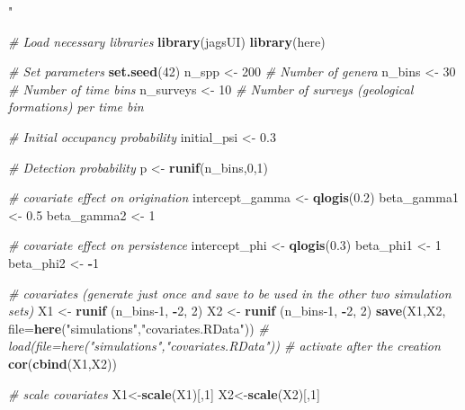 \documentclass[
]{article}
\newenvironment{Shaded}{\begin{snugshade}}{\end{snugshade}}
\newcommand{\AttributeTok}[1]{\textcolor[rgb]{0.13,0.29,0.53}{#1}}
\newcommand{\CommentTok}[1]{\textcolor[rgb]{0.56,0.35,0.01}{\textit{#1}}}
\newcommand{\DecValTok}[1]{\textcolor[rgb]{0.00,0.00,0.81}{#1}}
\newcommand{\FloatTok}[1]{\textcolor[rgb]{0.00,0.00,0.81}{#1}}
\newcommand{\FunctionTok}[1]{\textcolor[rgb]{0.13,0.29,0.53}{\textbf{#1}}}
\newcommand{\NormalTok}[1]{#1}
\newcommand{\OtherTok}[1]{\textcolor[rgb]{0.56,0.35,0.01}{#1}}
\newcommand{\SpecialCharTok}[1]{\textcolor[rgb]{0.81,0.36,0.00}{\textbf{#1}}}
\newcommand{\StringTok}[1]{\textcolor[rgb]{0.31,0.60,0.02}{#1}}
\begin{document}
{\begin{Shaded}
\begin{Highlighting}[]
\StringTok{"}

\CommentTok{\# Load necessary libraries}
\FunctionTok{library}\NormalTok{(jagsUI)}
\FunctionTok{library}\NormalTok{(here)}

\CommentTok{\# Set parameters}
\FunctionTok{set.seed}\NormalTok{(}\DecValTok{42}\NormalTok{)}
\NormalTok{n\_spp }\OtherTok{\textless{}{-}} \DecValTok{200}  \CommentTok{\# Number of genera}
\NormalTok{n\_bins }\OtherTok{\textless{}{-}} \DecValTok{30}   \CommentTok{\# Number of time bins}
\NormalTok{n\_surveys }\OtherTok{\textless{}{-}} \DecValTok{10}  \CommentTok{\# Number of surveys (geological formations) per time bin}

\CommentTok{\# Initial occupancy probability}
\NormalTok{initial\_psi }\OtherTok{\textless{}{-}} \FloatTok{0.3}

\CommentTok{\# Detection probability}
\NormalTok{p }\OtherTok{\textless{}{-}} \FunctionTok{runif}\NormalTok{(n\_bins,}\DecValTok{0}\NormalTok{,}\DecValTok{1}\NormalTok{)  }

\CommentTok{\# covariate effect on origination}
\NormalTok{intercept\_gamma }\OtherTok{\textless{}{-}} \FunctionTok{qlogis}\NormalTok{(}\FloatTok{0.2}\NormalTok{) }
\NormalTok{beta\_gamma1 }\OtherTok{\textless{}{-}} \FloatTok{0.5}
\NormalTok{beta\_gamma2 }\OtherTok{\textless{}{-}} \DecValTok{1}

\CommentTok{\# covariate effect on persistence}
\NormalTok{intercept\_phi }\OtherTok{\textless{}{-}} \FunctionTok{qlogis}\NormalTok{(}\FloatTok{0.3}\NormalTok{)  }
\NormalTok{beta\_phi1 }\OtherTok{\textless{}{-}} \DecValTok{1}
\NormalTok{beta\_phi2 }\OtherTok{\textless{}{-}} \SpecialCharTok{{-}}\DecValTok{1}

\CommentTok{\# covariates (generate just once and save to be used in the other two simulation sets)}
\NormalTok{X1 }\OtherTok{\textless{}{-}} \FunctionTok{runif}\NormalTok{ (n\_bins}\DecValTok{{-}1}\NormalTok{, }\SpecialCharTok{{-}}\DecValTok{2}\NormalTok{, }\DecValTok{2}\NormalTok{) }
\NormalTok{X2 }\OtherTok{\textless{}{-}} \FunctionTok{runif}\NormalTok{ (n\_bins}\DecValTok{{-}1}\NormalTok{, }\SpecialCharTok{{-}}\DecValTok{2}\NormalTok{, }\DecValTok{2}\NormalTok{)  }
\FunctionTok{save}\NormalTok{(X1,X2, }\AttributeTok{file=}\FunctionTok{here}\NormalTok{(}\StringTok{"simulations"}\NormalTok{,}\StringTok{"covariates.RData"}\NormalTok{))}
\CommentTok{\# load(file=here("simulations","covariates.RData")) \# activate after the creation}
\FunctionTok{cor}\NormalTok{(}\FunctionTok{cbind}\NormalTok{(X1,X2))}

\CommentTok{\# scale covariates}
\NormalTok{X1}\OtherTok{\textless{}{-}}\FunctionTok{scale}\NormalTok{(X1)[,}\DecValTok{1}\NormalTok{]}
\NormalTok{X2}\OtherTok{\textless{}{-}}\FunctionTok{scale}\NormalTok{(X2)[,}\DecValTok{1}\NormalTok{]}



\end{Highlighting}
\end{Shaded}}
\end{document}
